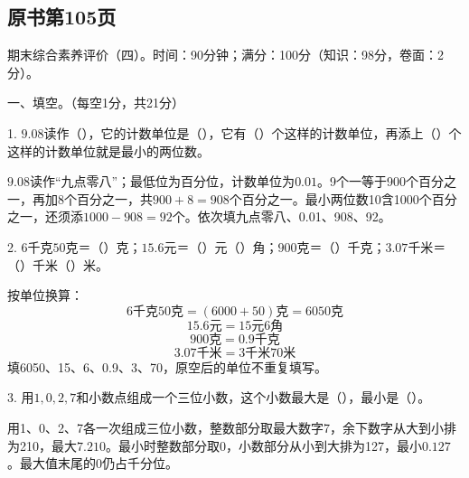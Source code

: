 

\subsection*{原书第105页}

期末综合素养评价（四）。时间：90分钟；满分：100分（知识：98分，卷面：2分）。\par 一、填空。（每空1分，共21分）\par 1. \(9.08\)读作（\hspace{1.8em}），它的计数单位是（\hspace{1.8em}），它有（\hspace{1.8em}）个这样的计数单位，再添上（\hspace{1.8em}）个这样的计数单位就是最小的两位数。\par
\begin{BookAnswer}
\(9.08\)读作“九点零八”；最低位为百分位，计数单位为\(0.01\)。9个一等于900个百分之一，再加8个百分之一，共\(900+8=908\)个百分之一。最小两位数10含1000个百分之一，还须添\(1000-908=92\)个。依次填九点零八、0.01、908、92。
\end{BookAnswer}

2. \(6\)千克\(50\)克＝（\hspace{1.8em}）克；\allowbreak{}\(15.6\)元＝（\hspace{1.8em}）元（\hspace{1.8em}）角；\allowbreak{}\(900\)克＝（\hspace{1.8em}）千克；\allowbreak{}\(3.07\)千米＝（\hspace{1.8em}）千米（\hspace{1.8em}）米。\par
\begin{BookAnswer}
按单位换算：\[6\text{千克}50\text{克}=(6000+50)\text{克}=6050\text{克}\]\[15.6\text{元}=15\text{元}6\text{角}\]\[900\text{克}=0.9\text{千克}\]\[3.07\text{千米}=3\text{千米}70\text{米}\]填6050、15、6、0.9、3、70，原空后的单位不重复填写。
\end{BookAnswer}

3. 用\(1,0,2,7\)和小数点组成一个三位小数，这个小数最大是（\hspace{1.8em}），最小是（\hspace{1.8em}）。\par
\begin{BookAnswer}
用1、0、2、7各一次组成三位小数，整数部分取最大数字7，余下数字从大到小排为210，最大\(7.210\)。最小时整数部分取0，小数部分从小到大排为127，最小\(0.127\)。最大值末尾的0仍占千分位。
\end{BookAnswer}

